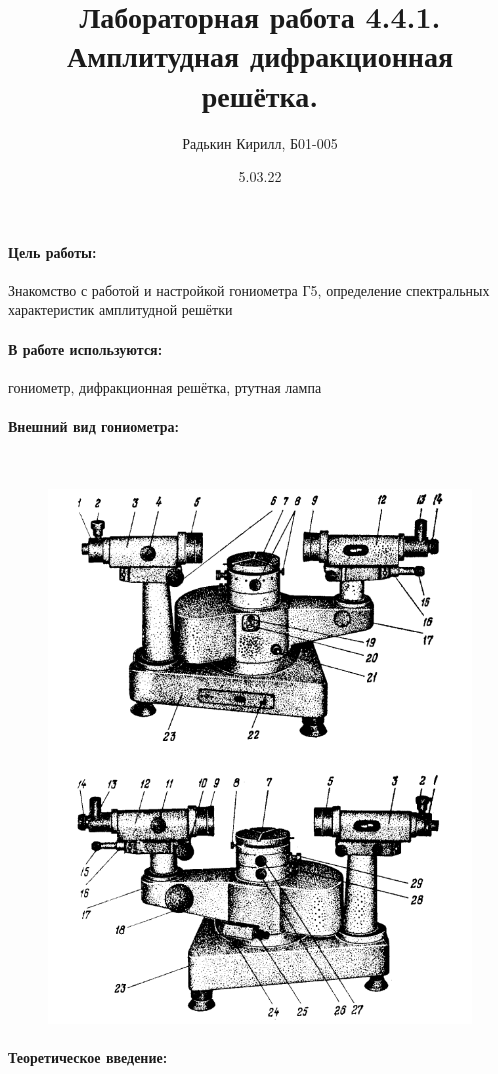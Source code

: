 \documentclass[a4paper, 12pt]{article}
\author{Радькин Кирилл, Б01-005}
\date{5.03.22}
\title{Лабораторная работа 4.4.1. Амплитудная дифракционная решётка.}
\newcommand{\parag}[1]{\paragraph*{#1:}}
\begin{document}
\maketitle

\parag {Цель работы} Знакомство с работой и настройкой гониометра Г5, определение спектральных характеристик амплитудной решётки

\parag {В работе используются} гониометр, дифракционная решётка, ртутная лампа

\parag{Внешний вид гониометра}~

\begin{figure}[!h]
    \includegraphics[scale = 0.4]{pic1.png}
    \centering
    \label{pic1}
\end{figure}

\parag {Теоретическое введение}
\end{document}
